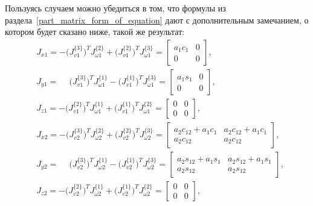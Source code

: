 Пользуясь случаем можно убедиться в том, что формулы из раздела~\ref{part_matrix_form_of_equation} дают с дополнительным замечанием, о котором будет сказано ниже, такой же результат:
\begin{align}
    &J_{x1} =  - \bigl( J_{v1}^{\{3\}} \bigr)^T J_{\omega 1}^{\{2\}} + \bigl( J_{v1}^{\{2\}} \bigr)^T J_{\omega 1}^{\{3\}} =
    \begin{bmatrix}
        a_1 c_1 & 0 \\
        0 & 0
    \end{bmatrix}\!\!,
    \\
    &J_{y1} = \phantom{-}\bigl( J_{v1}^{\{3\}} \bigr)^T J_{\omega 1}^{\{1\}} - \bigl( J_{v1}^{\{1\}} \bigr)^T J_{\omega 1}^{\{3\}} =
    \begin{bmatrix}
        a_1 s_1 & 0 \\
        0 & 0
    \end{bmatrix}\!\!,
    \\
    &J_{z1} =  - \bigl( J_{v1}^{\{2\}} \bigr)^T J_{\omega 1}^{\{1\}} + \bigl( J_{v1}^{\{1\}} \bigr)^T J_{\omega 1}^{\{2\}} =
    \begin{bmatrix}
        0 & 0 \\
        0 & 0
    \end{bmatrix}\!\!,
    \\[0.5cm]
    &J_{x2} =  - \bigl( J_{v2}^{\{3\}} \bigr)^T J_{\omega 2}^{\{2\}} + \bigl( J_{v2}^{\{2\}} \bigr)^T J_{\omega 2}^{\{3\}} =
    \begin{bmatrix}
        a_2 c_{12} + a_1 c_1 & a_2 c_{12} + a_1 c_1 \\
        a_2 c_{12} & a_2 c_{12}
    \end{bmatrix}\!\!,
    \\
    &J_{y2} = \phantom{-}\bigl( J_{v2}^{\{3\}} \bigr)^T J_{\omega 2}^{\{1\}} - \bigl( J_{v2}^{\{1\}} \bigr)^T J_{\omega 2}^{\{3\}} =
    \begin{bmatrix}
        a_2 s_{12} + a_1 s_1 & a_2 s_{12} + a_1 s_1 \\
        a_2 s_{12} & a_2 s_{12}
    \end{bmatrix}\!\!,
    \\
    &J_{z2} =  - \bigl( J_{v2}^{\{2\}} \bigr)^T J_{\omega 2}^{\{1\}} + \bigl( J_{v2}^{\{1\}} \bigr)^T J_{\omega 2}^{\{2\}} =
    \begin{bmatrix}
        0 & 0 \\
        0 & 0
    \end{bmatrix}\!\!,
\end{align}
